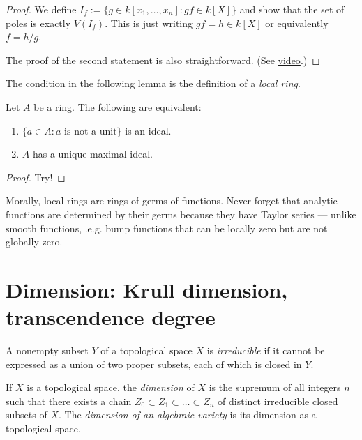 \begin{proof}
We define $I_f:=\{g \in k[x_1,…,x_n]:gf \in k[X]\}$ 
and show that the set of poles is exactly $V(I_f)$.
This is just writing  $gf = h \in k[X]$
or equivalently $f=h/g$.

The proof of the second statement is also straightforward.
(See \href{https://www.youtube.com/watch?v=XJJ04OQnDfc}{video}.)
\end{proof}

\medskip\noindent
The condition in the following lemma is the
definition of a {\it local ring}.

\begin{lemma}
\label{lemma-maximal-ideal}
Let $A$ be a ring. The following are equivalent:
\begin{enumerate}
\item $\{a \in A:a \text{ is not a unit}\}$ is an ideal.
\item $A$ has a unique maximal ideal.
\end{enumerate}
\end{lemma}

\begin{proof}
Try!
\end{proof}

\noindent
Morally, local rings are rings of germs of functions.
Never forget that analytic functions are determined
by their germs because they have Taylor series ---
unlike smooth functions, .e.g. bump functions that
can be locally zero but are not globally zero.

\section{Dimension: Krull dimension, transcendence degree}
\label{section-dimension}

\begin{definition}
\label{definition-irreducible-topological}
A nonempty subset $Y$ of a topological space $X$
is {\it irreducible} if it cannot be expressed
as a union of two proper subsets,
each of which is closed in $Y$.
\end{definition}

\begin{definition}
\label{definition-topological-space-dimension}
If $X$ is a topological space,
the {\it dimension} of $X$ is the supremum of all integers $n$
such that there exists a chain
$Z_0 \subset Z_1\subset … \subset Z_n$
of distinct irreducible closed subsets of $X$.
The {\it dimension of an algebraic variety}
is its dimension as a topological space.
\end{definition}

